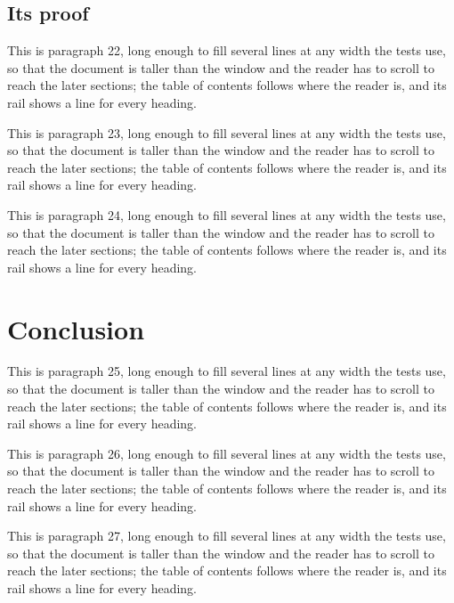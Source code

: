 \subsection{Its proof}
This is paragraph 22, long enough to fill several lines at any width the tests use, so that the
document is taller than the window and the reader has to scroll to reach the later sections; the
table of contents follows where the reader is, and its rail shows a line for every heading.

This is paragraph 23, long enough to fill several lines at any width the tests use, so that the
document is taller than the window and the reader has to scroll to reach the later sections; the
table of contents follows where the reader is, and its rail shows a line for every heading.

This is paragraph 24, long enough to fill several lines at any width the tests use, so that the
document is taller than the window and the reader has to scroll to reach the later sections; the
table of contents follows where the reader is, and its rail shows a line for every heading.

\section{Conclusion}
This is paragraph 25, long enough to fill several lines at any width the tests use, so that the
document is taller than the window and the reader has to scroll to reach the later sections; the
table of contents follows where the reader is, and its rail shows a line for every heading.

This is paragraph 26, long enough to fill several lines at any width the tests use, so that the
document is taller than the window and the reader has to scroll to reach the later sections; the
table of contents follows where the reader is, and its rail shows a line for every heading.

This is paragraph 27, long enough to fill several lines at any width the tests use, so that the
document is taller than the window and the reader has to scroll to reach the later sections; the
table of contents follows where the reader is, and its rail shows a line for every heading.
